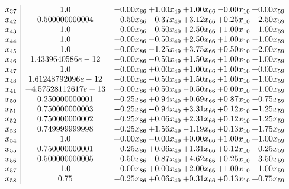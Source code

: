\documentclass[8pt]{article}
\begin{document}
\[\begin{array}{c| c c@{\hskip 2pt} c@{\hskip 2pt} c@{\hskip 2pt} c@{\hskip 2pt} c@{\hskip 2pt} }
 x_{37}   &  1.0 & -0.00 x_{86} & +  1.00 x_{49} & +  1.00 x_{66} & -0.00 x_{10} & +  0.00 x_{59}\\
 x_{42}   &  0.500000000004 & +  0.50 x_{86} & -0.37 x_{49} & +  3.12 x_{66} & +  0.25 x_{10} & -2.50 x_{59}\\
 x_{43}   &  1.0 & -0.00 x_{86} & -0.50 x_{49} & +  2.50 x_{66} & +  1.00 x_{10} & -1.00 x_{59}\\
 x_{44}   &  1.0 & -0.00 x_{86} & -0.50 x_{49} & +  2.50 x_{66} & +  1.00 x_{10} & -1.00 x_{59}\\
 x_{45}   &  1.0 & -0.00 x_{86} & -1.25 x_{49} & +  3.75 x_{66} & +  0.50 x_{10} & -2.00 x_{59}\\
 x_{46}   &  1.4339640586e-12 & -0.00 x_{86} & -0.50 x_{49} & +  1.50 x_{66} & +  1.00 x_{10} & -1.00 x_{59}\\
 x_{47}   &  1.0 & -0.00 x_{86} & +  0.00 x_{49} & +  1.00 x_{66} & +  1.00 x_{10} & +  0.00 x_{59}\\
 x_{48}   &  1.61248792096e-12 & -0.00 x_{86} & -0.50 x_{49} & +  1.50 x_{66} & +  1.00 x_{10} & -1.00 x_{59}\\
 x_{41}   &  -4.57528112617e-13 & +  0.00 x_{86} & +  0.50 x_{49} & -0.50 x_{66} & +  0.00 x_{10} & +  1.00 x_{59}\\
 x_{50}   &  0.250000000001 & +  0.25 x_{86} & +  0.94 x_{49} & +  0.69 x_{66} & +  0.87 x_{10} & -0.75 x_{59}\\
 x_{51}   &  0.750000000003 & -0.25 x_{86} & -0.94 x_{49} & +  3.31 x_{66} & +  0.12 x_{10} & -1.25 x_{59}\\
 x_{52}   &  0.750000000002 & -0.25 x_{86} & +  0.06 x_{49} & +  2.31 x_{66} & +  0.12 x_{10} & -1.25 x_{59}\\
 x_{53}   &  0.749999999998 & -0.25 x_{86} & +  1.56 x_{49} & -1.19 x_{66} & +  0.13 x_{10} & +  1.75 x_{59}\\
 x_{54}   &  1.0 & +  0.00 x_{86} & -0.00 x_{49} & +  0.00 x_{66} & +  1.00 x_{10} & +  1.00 x_{59}\\
 x_{55}   &  0.750000000001 & -0.25 x_{86} & +  0.06 x_{49} & +  1.31 x_{66} & +  0.12 x_{10} & -0.25 x_{59}\\
 x_{56}   &  0.500000000005 & +  0.50 x_{86} & -0.87 x_{49} & +  4.62 x_{66} & +  0.25 x_{10} & -3.50 x_{59}\\
 x_{57}   &  1.0 & -0.00 x_{86} & +  0.00 x_{49} & +  2.00 x_{66} & +  1.00 x_{10} & -1.00 x_{59}\\
 x_{58}   &  0.75 & -0.25 x_{86} & +  0.06 x_{49} & +  0.31 x_{66} & +  0.13 x_{10} & +  0.75 x_{59}\\

\end{array}\]
\end{document}
